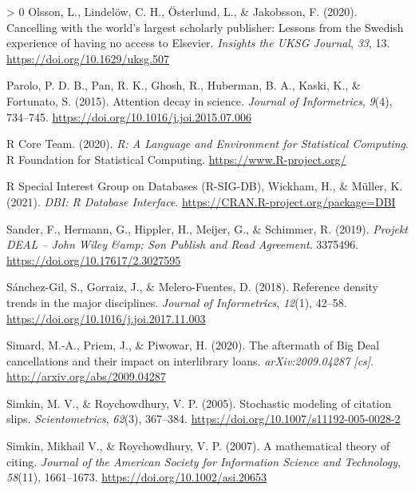 \documentclass[
]{article}
\newlength{\cslhangindent}
\newenvironment{CSLReferences}[3] %
 {%
  \setlength{\parindent}{0pt}
  \ifodd #1 \everypar{\setlength{\hangindent}{\cslhangindent}}\ignorespaces\fi
  \ifnum #2 > 0
  \setlength{\parskip}{#3\baselineskip}
  \fi
 }%
 {}
\begin{document}
\begin{CSLReferences}{1}{0}
\leavevmode\hypertarget{ref-olsson_cancelling_2020}{}%
Olsson, L., Lindelöw, C. H., Österlund, L., \& Jakobsson, F. (2020). Cancelling with the world's largest scholarly publisher: Lessons from the {Swedish} experience of having no access to {Elsevier}. \emph{Insights the UKSG Journal}, \emph{33}, 13. \url{https://doi.org/10.1629/uksg.507}

\leavevmode\hypertarget{ref-parolo_attention_2015}{}%
Parolo, P. D. B., Pan, R. K., Ghosh, R., Huberman, B. A., Kaski, K., \& Fortunato, S. (2015). Attention decay in science. \emph{Journal of Informetrics}, \emph{9}(4), 734--745. \url{https://doi.org/10.1016/j.joi.2015.07.006}

\leavevmode\hypertarget{ref-r_core_team_r_2020}{}%
R Core Team. (2020). \emph{R: {A} {Language} and {Environment} for {Statistical} {Computing}}. R Foundation for Statistical Computing. \url{https://www.R-project.org/}

\leavevmode\hypertarget{ref-r_special_interest_group_on_databases_r-sig-db_dbi_2021}{}%
R Special Interest Group on Databases (R-SIG-DB), Wickham, H., \& Müller, K. (2021). \emph{{DBI}: {R} {Database} {Interface}}. \url{https://CRAN.R-project.org/package=DBI}

\leavevmode\hypertarget{ref-sander_projekt_2019}{}%
Sander, F., Hermann, G., Hippler, H., Meijer, G., \& Schimmer, R. (2019). \emph{Projekt {DEAL} -- {John} {Wiley} \&amp; {Son} {Publish} and {Read} {Agreement}}. 3375496. \url{https://doi.org/10.17617/2.3027595}

\leavevmode\hypertarget{ref-sanchez-gil_reference_2018}{}%
Sánchez-Gil, S., Gorraiz, J., \& Melero-Fuentes, D. (2018). Reference density trends in the major disciplines. \emph{Journal of Informetrics}, \emph{12}(1), 42--58. \url{https://doi.org/10.1016/j.joi.2017.11.003}

\leavevmode\hypertarget{ref-simard_aftermath_2020}{}%
Simard, M.-A., Priem, J., \& Piwowar, H. (2020). The aftermath of {Big} {Deal} cancellations and their impact on interlibrary loans. \emph{arXiv:2009.04287 {[}cs{]}}. \url{http://arxiv.org/abs/2009.04287}

\leavevmode\hypertarget{ref-simkin_stochastic_2005}{}%
Simkin, M. V., \& Roychowdhury, V. P. (2005). Stochastic modeling of citation slips. \emph{Scientometrics}, \emph{62}(3), 367--384. \url{https://doi.org/10.1007/s11192-005-0028-2}

\leavevmode\hypertarget{ref-simkin_mathematical_2007}{}%
Simkin, Mikhail V., \& Roychowdhury, V. P. (2007). A mathematical theory of citing. \emph{Journal of the American Society for Information Science and Technology}, \emph{58}(11), 1661--1673. \url{https://doi.org/10.1002/asi.20653}


\end{CSLReferences}
\end{document}
